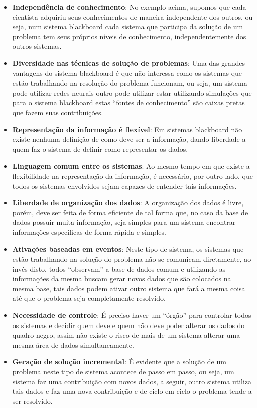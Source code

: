 	 \begin{itemize}
	 \item \textbf{Independência de conhecimento}: No exemplo acima, supomos que cada cientista adquiriu seus conhecimentos de maneira independente dos outros, ou seja, num sistema blackboard cada sistema que participa da solução de um problema tem seus próprios níveis de conhecimento, independentemente dos outros sistemas.
	 \item \textbf{Diversidade nas técnicas de solução de problemas}: Uma das grandes vantagens do sistema blackboard é que não interessa como os sistemas que estão trabalhando na resolução do problema funcionam, ou seja, um sistema pode utilizar redes neurais outro pode utilizar estar utilizando simulações que para o sistema blackboard estas “fontes de conhecimento” são caixas pretas que fazem suas contribuições.
	 \item \textbf{Representação da informação é flexível}: Em sistemas blackboard não existe nenhuma definição de como deve ser a informação, dando liberdade a quem faz o sistema de definir como representar os dados.
	 \item \textbf{Linguagem comum entre os sistemas}: Ao mesmo tempo em que existe a flexibilidade na representação da informação, é necessário, por outro lado, que todos os sistemas envolvidos sejam capazes de entender tais informações.
	 \item \textbf{Liberdade de organização dos dados}: A organização dos dados é livre, porém, deve ser feita de forma eficiente de tal forma que, no caso da base de dados possuir muita informação, seja simples para um sistema encontrar informações específicas de forma rápida e simples.
	 \item \textbf{Ativações baseadas em eventos}: Neste tipo de sistema, os sistemas que estão trabalhando na solução do problema não se comunicam diretamente, ao invés disto, todos “observam” a base de dados comum e utilizando as informações da mesma buscam gerar novos dados que são colocados na mesma base, tais dados podem ativar outro sistema que fará a mesma coisa até que o problema seja completamente resolvido.
	 \item \textbf{Necessidade de controle}: É preciso haver um “órgão” para controlar todos os sistemas e decidir quem deve e quem não deve poder alterar os dados do quadro negro, assim não existe o risco de mais de um sistema alterar uma mesma área de dados simultaneamente.
	 \item \textbf{Geração de solução incremental}: É evidente que a solução de um problema neste tipo de sistema acontece de passo em passo, ou seja, um sistema faz uma contribuição com novos dados, a seguir, outro sistema utiliza tais dados e faz uma nova contribuição e de ciclo em ciclo o problema tende a ser resolvido. 
	 \end{itemize}

